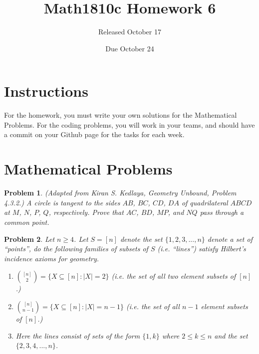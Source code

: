 \documentclass{article}
\title{Math1810c Homework 6}
\author{Released October 17}
\date{Due October 24}
\newtheorem{problem}{Problem}
\begin{document}
\maketitle

\section{Instructions}

For the homework, you must write your own solutions for the Mathematical Problems. For the coding problems, you will work in your teams, and should have a commit on your Github page for the tasks for each week. 

\section{Mathematical Problems}

\begin{problem}
    (Adapted from Kiran S. Kedlaya, \emph{Geometry Unbound}, Problem 4.3.2.)
    A circle is tangent to the sides $AB$, $BC$, $CD$, $DA$ of quadrilateral
    $ABCD$ at $M$, $N$, $P$, $Q$, respectively. Prove that $AC$, $BD$, $MP$,
    and $NQ$ pass through a common point.
\end{problem}


\begin{problem}
    Let $n\geq 4$. Let $S=[n]$ denote the set $\{1,2,3,...,n\}$ denote a set of ``points'', do the following families of subsets of $S$ (i.e. ``lines'') satisfy Hilbert's incidence axioms for geometry. 
    \begin{enumerate}
        \item $\binom{[n]}{2}=\{X\subseteq [n]: \vert X\vert =2\}$ (i.e. the set of all two element subsets of $[n]$.)
        \item $\binom{[n]}{n-1}=\{X\subseteq [n]: \vert X\vert =n-1\}$ (i.e. the set of all $n-1$ element subsets of $[n]$.)
        \item Here the lines consist of sets of the form $\{1,k\}$ where $2\leq k\leq n$ and the set $\{2,3,4,...,n\}$.
    \end{enumerate}
\end{problem}
\end{document}
